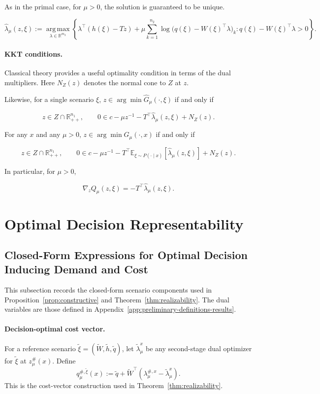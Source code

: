 \documentclass{article}
\newcommand{\1}{\mathbf{1}}
\theoremstyle{plain}
\theoremstyle{definition}
\theoremstyle{remark}
\begin{document}
As in the primal case, for \(\mu > 0\), the solution is guaranteed to be unique.

\[
\hat\lambda_\mu(z,\xi)
:=
\operatorname*{arg\,max}_{\lambda\in\mathbb R^{m_2}}
\left\{
\lambda^\top(h(\xi)-Tz)
+
\mu\sum_{k=1}^{n_2}
\log\bigl(q(\xi)-W(\xi)^\top\lambda\bigr)_k
:
q(\xi)-W(\xi)^\top\lambda>0
\right\}.
\]

\paragraph{KKT conditions.}

Classical theory provides a useful optimality condition in terms of the dual multipliers. Here \(N_Z(z)\) denotes the normal cone to \(Z\) at \(z\).

Likewise, for a single scenario \(\xi\),
\(z\in\arg\min \widehat G_\mu(\cdot,\xi)\) if and only if

\[
z\in Z\cap \mathbb R^{n_1}_{++},
\qquad
0
\in
c-\mu z^{-1}
-
T^\top\hat\lambda_\mu(z,\xi)
+
N_Z(z).
\]

For any \(x\) and any \(\mu>0\),
\(z\in \arg\min G_\mu(\cdot,x)\) if and only if

\[
z\in Z\cap \mathbb R^{n_1}_{++},
\qquad
0
\in
c-\mu z^{-1}
-
T^\top
\mathbb E_{\xi\sim P(\cdot\mid x)}
\left[
\hat\lambda_\mu(z,\xi)
\right]
+
N_Z(z).
\]

In particular, for \(\mu>0\),

\[
\nabla_z Q_\mu(z,\xi)
=
-T^\top\hat\lambda_\mu(z,\xi).
\]

\section{Optimal Decision Representability}
\label{app:realizability-proof}


\subsection{Closed-Form Expressions for Optimal Decision Inducing Demand and Cost}

This subsection records the closed-form scenario components used in Proposition~\ref{prop:constructive} and Theorem~\ref{thm:realizability}. The dual variables are those defined in Appendix~\ref{app:preliminary-definitions-results}.

\paragraph{Decision-optimal cost vector.}
For a reference scenario $\tilde\xi=(\widetilde W,\widetilde h,\widetilde q)$, let $\widetilde\lambda_\mu^x$ be any second-stage dual optimizer for $\tilde\xi$ at $z_\mu^\#(x)$. Define
\begin{equation}
\label{eq:core-q-construct}
q_\mu^{\#,\tilde\xi}(x)
:=
\widetilde q+
\widetilde W^\top
\left(
\lambda_\mu^{\#,x}-\widetilde\lambda_\mu^x
\right).
\end{equation}
This is the cost-vector construction used in Theorem~\ref{thm:realizability}.
\end{document}
